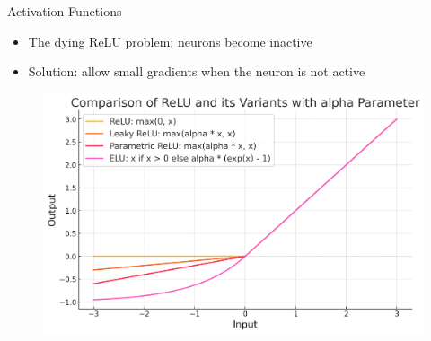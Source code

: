 \documentclass[usenames,dvipsnames,notes,11pt,aspectratio=169]{beamer}
\begin{document}
\begin{frame}{Activation Functions}
    \begin{itemize}
        \item The dying ReLU problem: neurons become inactive 
        \item Solution: allow small gradients when the neuron is not active
    \end{itemize}
\begin{figure}
\includegraphics[height=0.55\textheight]{figures/relu-variants} 
\end{figure}
\end{frame}
\end{document}
